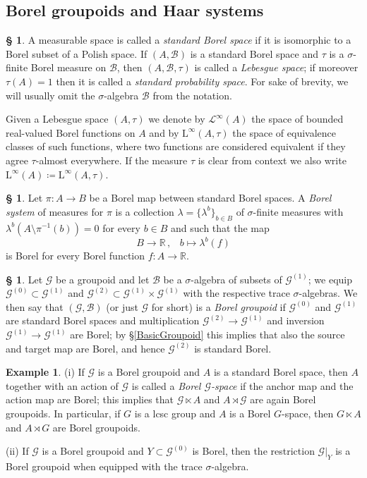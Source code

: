 \documentclass[11pt, oneside]{amsart}
\theoremstyle{definition}
\newtheorem{example}[lemma]{Example}
\newtheorem{no}[lemma]{\S}
\theoremstyle{remark}
\theoremstyle{TheoremNum}
\newcommand{\Linf}{\mathrm{L}^{\infty}}
\newcommand{\cG}{\mathcal{G}}
\newcommand{\cB}{\mathcal B}
\newcommand{\cL}{\mathcal L}
\begin{document}
 \subsection{Borel groupoids and Haar systems}\label{sec2.2}
\begin{no}\label{borel groupoids} A measurable space is called a \emph{standard Borel space} if it is isomorphic to a Borel subset of a Polish space. If $(A, \cB)$ is a standard Borel space and $\tau$ is a $\sigma$-finite Borel measure on $\cB$, then $(A, \cB, \tau)$ is called a \emph{Lebesgue space}; if moreover $\tau(A) = 1$ then it is called a \emph{standard probability space}. For sake of brevity, we will usually omit the $\sigma$-algebra $\mathcal{B}$ from the notation.

Given a Lebesgue space $(A, \tau)$ we denote by $\cL^\infty(A)$ the space of bounded real-valued Borel functions on $A$ and by $\Linf(A,\tau)$ the space of equivalence classes of such functions, where two functions are considered equivalent if they agree $\tau$-almost everywhere. If the measure $\tau$ is clear from context we also write $\Linf(A) \coloneqq \Linf(A, \tau)$.
\end{no}
\begin{no} Let $\pi:A\to B$ be a Borel map between standard Borel spaces. A \emph{Borel system} of measures for $\pi$ is a collection $\lambda =\{\lambda^b\}_{b\in B}$ of $\sigma$-finite measures with $\lambda^b(A\setminus \pi^{-1}(b))=0$ for every $b\in B$ and such that the map 
\[B\to \mathbb{R}\,,\;\;\;b\mapsto \lambda^b(f)\] is Borel for every Borel function $f:A\to \mathbb{R}$. 
\end{no}
\begin{no} Let  $\mathcal{G}$ be a groupoid and let $\cB$ be a $\sigma$-algebra of subsets of $\cG^{(1)}$; we equip $\cG^{(0)} \subset \cG^{(1)}$ and $\cG^{(2)} \subset \cG^{(1)} \times \cG^{(1)}$ with the respective trace $\sigma$-algebras. We then say that $(\cG, \cB)$ (or just $\cG$ for short) is a \emph{Borel groupoid} if $\mathcal{G}^{(0)}$ and $\mathcal{G}^{(1)}$ are standard Borel spaces and multiplication $\cG^{(2)} \to \cG^{(1)}$ and inversion $\cG^{(1)} \to \cG^{(1)}$ are Borel; by \S \ref{BasicGroupoid} this implies that also the source and target map are Borel, and hence $\cG^{(2)}$ is standard Borel.
\end{no}
\begin{example}\label{ResBorel}
(i) If $\cG$ is a Borel groupoid and $A$ is a standard Borel space, then $A$ together with an action of $\cG$ is called a \emph{Borel $\cG$-space} if the anchor map and the action map are Borel; this implies that $\cG \ltimes A$ and $A \rtimes \cG$ are again Borel groupoids. In particular, if $G$ is a lcsc group and $A$ is a Borel $G$-space, then $G \ltimes A$ and $A \rtimes G$ are Borel groupoids.

\item (ii) If $\cG$ is a Borel groupoid and $Y \subset \cG^{(0)}$ is Borel, then the restriction $\cG|_Y$ is a Borel groupoid when equipped with the trace $\sigma$-algebra.
\end{example}
\end{document}
